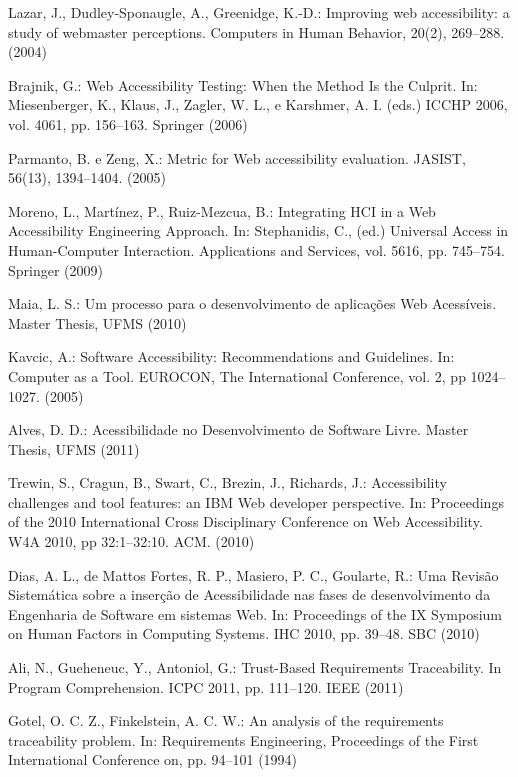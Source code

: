 \documentclass[runningheads,a4paper]{llncs}
\begin{document}
\begin{thebibliography}{4}

 Lazar, J., Dudley-Sponaugle, A.,  Greenidge, K.-D.: Improving web accessibility:
a study of webmaster perceptions. Computers in Human Behavior, 20(2), 269--288. (2004)

 Brajnik, G.: Web Accessibility Testing: When the Method Is the Culprit. In: Miesenberger, K., Klaus, J., Zagler, W. L., e Karshmer, A. I. (eds.) ICCHP 2006, vol. 4061, pp. 156--163. Springer (2006)

 Parmanto, B. e Zeng, X.: Metric for Web accessibility evaluation. JASIST, 56(13), 1394--1404. (2005)

 Moreno, L., Martínez, P., Ruiz-Mezcua, B.: Integrating HCI in a Web Accessibility Engineering Approach. In: Stephanidis, C., (ed.) Universal Access in Human-Computer Interaction. Applications and Services, vol. 5616, pp. 745--754. Springer (2009)

 Maia, L. S.: Um processo para o desenvolvimento de aplicações Web Acessíveis.
Master Thesis, UFMS (2010)

 Kavcic, A.: Software Accessibility: Recommendations and Guidelines. In: Computer as a Tool. EUROCON, The International Conference, vol. 2, pp 1024--1027. (2005)

 Alves, D. D.: Acessibilidade no Desenvolvimento de Software Livre. Master Thesis, UFMS (2011)

 Trewin, S., Cragun, B., Swart, C., Brezin, J., Richards, J.: Accessibility challenges
and tool features: an IBM Web developer perspective. In: Proceedings of the
2010 International Cross Disciplinary Conference on Web Accessibility. W4A 2010, pp 32:1--32:10. ACM. (2010)

 Dias, A. L., de Mattos Fortes, R. P., Masiero, P. C., Goularte, R.: Uma Revisão
Sistemática sobre a inserção de Acessibilidade nas fases de desenvolvimento da Engenharia
de Software em sistemas Web. In: Proceedings of the IX Symposium on Human
Factors in Computing Systems. IHC 2010, pp. 39--48. SBC (2010)

 Ali, N., Gueheneuc, Y., Antoniol, G.: Trust-Based Requirements Traceability.
In Program Comprehension. ICPC 2011, pp. 111--120. IEEE (2011)

 Gotel, O. C. Z., Finkelstein, A. C. W.: An analysis of the requirements traceability
problem. In: Requirements Engineering, Proceedings of the First International
Conference on, pp. 94--101 (1994)


\end{thebibliography}
\end{document}
